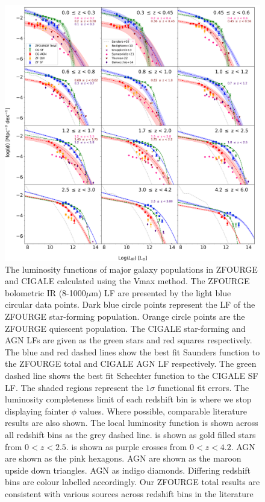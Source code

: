 \begin{figure}
    \centering
    \includegraphics[width=\textwidth]{Figures/LF.png}
    \caption{The luminosity functions of major galaxy populations in ZFOURGE and CIGALE calculated using the Vmax method. The ZFOURGE bolometric IR (8-1000$\mu$m) LF are presented by the light blue circular data points. Dark blue circle points represent the LF of the ZFOURGE star-forming population. Orange circle points are the ZFOURGE quiescent population. The CIGALE star-forming and AGN LFs are given as the green stars and red squares respectively. The blue and red dashed lines show the best fit Saunders function \citep{saunders_60-mum_1990} to the ZFOURGE total and CIGALE AGN LF respectively. The green dashed line shows the best fit Schechter function \citep{schechter_analytic_1976} to the CIGALE SF LF. The shaded regions represent the $1\sigma$ functional fit errors. The luminosity completeness limit of each redshift bin is where we stop displaying fainter $\phi$ values. Where possible, comparable literature results are also shown. The local \cite{sanders_iras_2003} luminosity function is shown across all redshift bins as the grey dashed line. \cite{rodighiero_mid-_2010} is shown as gold filled stars from $0 < z < 2.5$. \cite{gruppioni_herschel_2013} is shown as purple crosses from $0 < z < 4.2$. \cite{symeonidis_agn_2021} AGN are shown as the pink hexagons. \cite{thorne_deep_2022} AGN are shown as the maroon upside down triangles. \cite{delvecchio_tracing_2014} AGN as indigo diamonds. Differing redshift bins are colour labelled accordingly. Our ZFOURGE total results are consistent with various sources across redshift bins in the literature \citep{fu_decomposing_2010, caputi_infrared_2007, huang_local_2007}}
    \label{Fig: Bolometric IR LF}
\end{figure}

